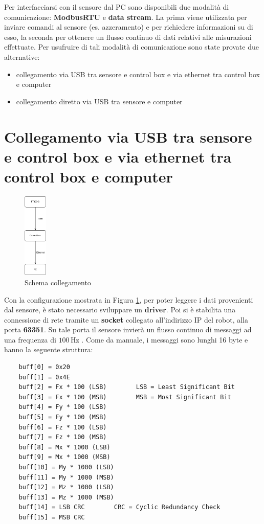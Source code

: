 Per interfacciarsi con il sensore dal PC sono disponibili due modalit\`{a} di comunicazione: \textbf{ModbusRTU} e \textbf{data stream}. 
La prima viene utilizzata per inviare comandi al sensore (es. azzeramento) e per richiedere informazioni su di esso, la seconda 
per ottenere un flusso continuo di dati relativi alle misurazioni effettuate. 
Per usufruire di tali modalit\`{a} di comunicazione sono state provate due alternative: 
\begin{itemize}
    \item collegamento via USB tra sensore e control box e via ethernet tra control box e computer
    \item collegamento diretto via USB tra sensore e computer
\end{itemize}
\section{Collegamento via USB tra sensore e control box e via ethernet tra control box e computer} \label{sec:scp}
\begin{figure}[H]
    \centering
    \includegraphics*[width=0.1\textwidth]{images/ft-cbox-pc.png}
    \caption{Schema collegamento}
    \label{fig:ft-cbox-pc}
\end{figure}
Con la configurazione mostrata in Figura \ref{fig:ft-cbox-pc}, per poter leggere i dati provenienti dal sensore, \`{e} stato 
necessario sviluppare un \textbf{driver}. 
Poi si \`{e} stabilita una connessione di rete tramite un \textbf{socket} collegato all'indirizzo IP del robot, 
alla porta \textbf{63351}. 
Su tale porta il sensore invier\`{a} un flusso continuo di messaggi ad una frequenza di $100 \, \text{Hz}$ \cite{ft_sensor}. 
Come da manuale, i messaggi sono lunghi 16 byte e hanno la seguente struttura: 
\begin{verbatim}
    buff[0] = 0x20
    buff[1] = 0x4E
    buff[2] = Fx * 100 (LSB)        LSB = Least Significant Bit
    buff[3] = Fx * 100 (MSB)        MSB = Most Significant Bit
    buff[4] = Fy * 100 (LSB)
    buff[5] = Fy * 100 (MSB)
    buff[6] = Fz * 100 (LSB)
    buff[7] = Fz * 100 (MSB)
    buff[8] = Mx * 1000 (LSB)
    buff[9] = Mx * 1000 (MSB)
    buff[10] = My * 1000 (LSB)
    buff[11] = My * 1000 (MSB)
    buff[12] = Mz * 1000 (LSB)
    buff[13] = Mz * 1000 (MSB)
    buff[14] = LSB CRC        CRC = Cyclic Redundancy Check
    buff[15] = MSB CRC
\end{verbatim} 
